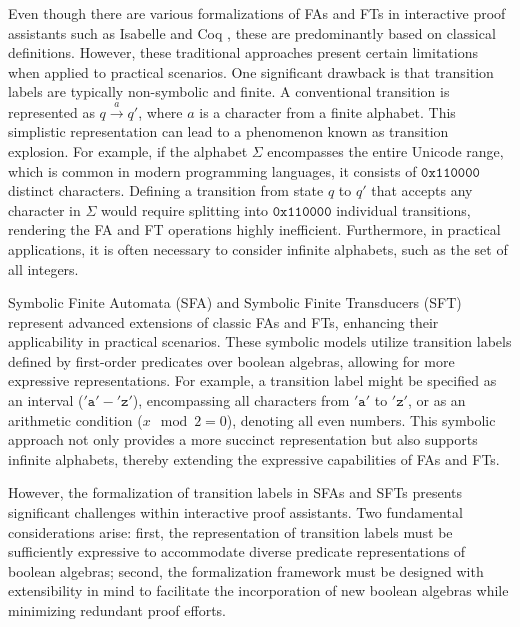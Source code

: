 \documentclass[sigplan,10pt,anonymous,review]{acmart}\settopmatter{printfolios=true,printccs=false,printacmref=false}
\begin{document}
Even though there are various formalizations of FAs and FTs in interactive proof assistants such as Isabelle \cite{isabelle-homepage} and Coq \cite{coq-homepage}, these are predominantly based on classical definitions. However, these traditional approaches present certain limitations when applied to practical scenarios. One significant drawback is that transition labels are typically non-symbolic and finite. A conventional transition is represented as $q\xrightarrow{a}q'$, where $a$ is a character from a finite alphabet. This simplistic representation can lead to a phenomenon known as transition explosion. For example, if the alphabet $\Sigma$ encompasses the entire Unicode range, which is common in modern programming languages, it consists of $\texttt{0x110000}$ distinct characters. Defining a transition from state $q$ to $q'$ that accepts any character in $\Sigma$ would require splitting into $\texttt{0x110000}$ individual transitions, rendering the FA and FT operations highly inefficient. Furthermore, in practical applications, it is often necessary to consider infinite alphabets, such as the set of all integers.



Symbolic Finite Automata (SFA) and Symbolic Finite Transducers (SFT) \cite{cav/DAntoniV17, VeanesHLMB12Transducer} represent advanced extensions of classic FAs and  FTs, enhancing their applicability in practical scenarios.
%
These symbolic models utilize transition labels defined by first-order predicates over boolean algebras, allowing for more expressive representations. For example, a transition label might be specified as an interval ($'\texttt{a}'-'\texttt{z}'$), encompassing all characters from $'\texttt{a}'$ to $'\texttt{z}'$, or as an arithmetic condition ($x \mod 2 = 0$), denoting all even numbers. This symbolic approach not only provides a more succinct representation but also supports infinite alphabets, thereby extending the expressive capabilities of FAs and FTs.



However, the formalization of transition labels in SFAs and SFTs presents significant challenges within interactive proof assistants. Two fundamental considerations arise: first, the representation of transition labels must be sufficiently expressive to accommodate diverse predicate representations of boolean algebras; second, the formalization framework must be designed with extensibility in mind to facilitate the incorporation of new boolean algebras while minimizing redundant proof efforts.
\end{document}
